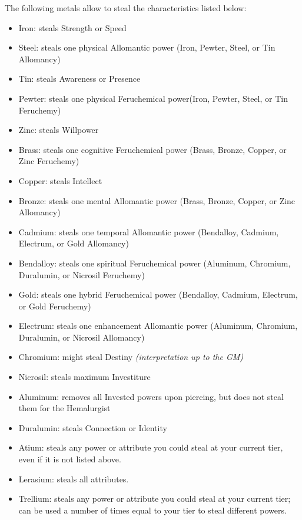 The following metals allow to steal the characteristics listed below:

\begin{itemize}
	\item Iron: steals Strength or Speed
	\item Steel: steals one physical Allomantic power (Iron, Pewter, Steel, or Tin Allomancy)
	\item Tin: steals Awareness or Presence
	\item Pewter: steals one physical Feruchemical power(Iron, Pewter, Steel, or Tin Feruchemy)
	\item Zinc: steals Willpower
	\item Brass: steals one cognitive Feruchemical power (Brass, Bronze, Copper, or Zinc Feruchemy)
	\item Copper: steals Intellect
	\item Bronze: steals one mental Allomantic power (Brass, Bronze, Copper, or Zinc Allomancy)
	\item Cadmium: steals one temporal Allomantic power (Bendalloy, Cadmium, Electrum, or Gold Allomancy)
	\item Bendalloy: steals one spiritual Feruchemical power (Aluminum, Chromium, Duralumin, or Nicrosil Feruchemy)
	\item Gold: steals one hybrid Feruchemical power (Bendalloy, Cadmium, Electrum, or Gold Feruchemy)
	\item Electrum: steals one enhancement Allomantic power (Aluminum, Chromium, Duralumin, or Nicrosil Allomancy)
	\item Chromium: might steal Destiny \textit{(interpretation up to the GM)}
	\item Nicrosil: steals maximum Investiture
	\item Aluminum: removes all Invested powers upon piercing, but does not steal them for the Hemalurgist
	\item Duralumin: steals Connection or Identity
	\item Atium: steals any power or attribute you could steal at your current tier, even if it is not listed above.
	\item Lerasium: steals all attributes.
	\item Trellium: steals any power or attribute you could steal at your current tier; can be used a number of times equal to your tier to steal different powers.
\end{itemize}



